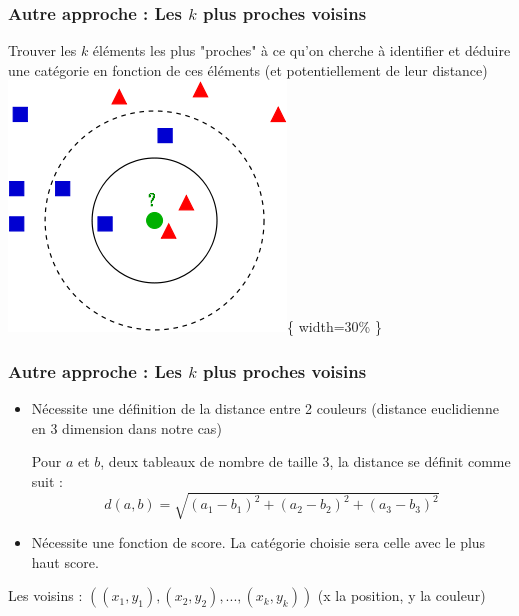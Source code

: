 \documentclass[french]{beamer}
\begin{document}
\begin{frame}
\frametitle{Autre approche : Les $k$ plus proches voisins}
Trouver les $k$ éléments les plus "proches" à ce qu'on cherche à identifier et déduire une catégorie en fonction de ces éléments (et potentiellement de leur distance)
\includegraphics{KnnClassification.png}\{ width=30\% \}
\end{frame}

\begin{frame}
\frametitle{Autre approche : Les $k$ plus proches voisins}

\begin{itemize}

\item{Nécessite une définition de la distance entre 2 couleurs (distance euclidienne en 3 dimension dans notre cas)}

Pour $a$ et $b$, deux tableaux de nombre de taille 3, la distance se définit comme suit :
$$ d(a,b) = \sqrt{(a_1-b_1)^2+(a_2-b_2)^2+(a_3-b_3)^2}$$

\item{Nécessite une fonction de score. La catégorie choisie sera celle avec le plus haut score.}
\end{itemize}

Les voisins : $((x_1,y_1),(x_2,y_2),...,(x_k,y_k))$ (x la position, y la couleur)

\end{frame}
\end{document}
